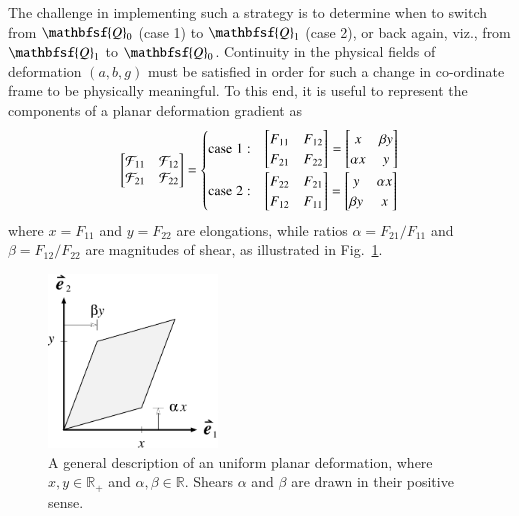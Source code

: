 The challenge in implementing such a strategy is to determine when to switch from $\mathbfsf{Q}_0$ (case 1) to $\mathbfsf{Q}_1$ (case 2), or back again, viz., from $\mathbfsf{Q}_1$ to $\mathbfsf{Q}_0$.  Continuity in the physical fields of deformation $(a , b , g )$ must be satisfied in order for such a change in co-ordinate frame to be physically meaningful.  To this end, it is useful to represent the components of a planar deformation gradient as
\begin{equation}
\begin{bmatrix}
\mathcal{F}_{11} & \mathcal{F}_{12} \\
\mathcal{F}_{21} & \mathcal{F}_{22}
\end{bmatrix} =
\begin{cases}
\mathrm{case} \; 1: & \begin{bmatrix}
F_{11} & F_{12} \\
F_{21} & F_{22}
\end{bmatrix}_{\vphantom{|}} = \begin{bmatrix}
x & \beta y \\ \alpha x & y
\end{bmatrix} \\
\mathrm{case} \; 2: & \begin{bmatrix}
F_{22} & F_{21} \\
F_{12} & F_{11}
\end{bmatrix} = \begin{bmatrix}
y & \alpha x \\ \beta y & x
\end{bmatrix}
\end{cases}
\label{deformationGradientRelabelling}
\end{equation}
where $x = F_{11}$ and $y = F_{22}$ are elongations, while ratios $\alpha = F_{21} / F_{11}$ and $\beta = F_{12} / F_{22}$ are magnitudes of shear, as illustrated in Fig.~\ref{figF}.  

\begin{figure}
	\centering
	\includegraphics[width=0.4\textwidth]{figures/figF.pdf}
	\caption{A general description of an uniform planar deformation, where $x , y \in \mathbb{R}_+$ and $\alpha , \beta \in \mathbb{R}$.  Shears $\alpha$ and $\beta$ are drawn in their positive sense.}
	\label{figF}
\end{figure}

